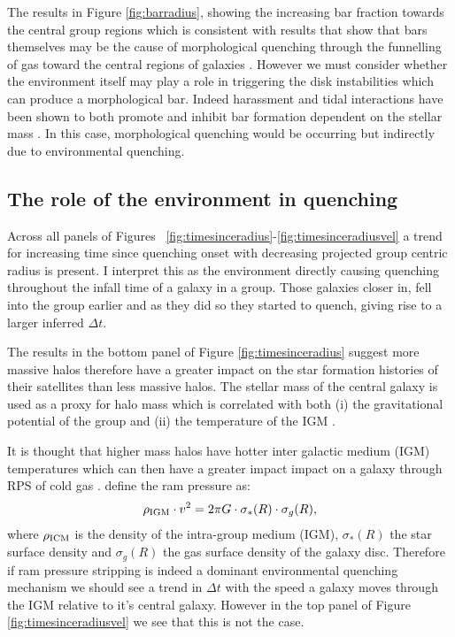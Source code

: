The results in Figure \ref{fig:barradius}, showing the increasing bar fraction towards the central group regions which is consistent with results that show that bars themselves may be the cause of morphological quenching through the funnelling of gas toward the central regions of galaxies \citep{athanassoula92b, sheth05,masters10c}. However we must consider whether the environment itself may play a role in triggering the disk instabilities which can produce a morphological bar. Indeed harassment and tidal interactions have been shown to both promote and inhibit bar formation dependent on the stellar mass \citep{noguchi88, moore96, skibba12}.  In this case, morphological quenching would be occurring but indirectly due to environmental quenching. 

\subsection{The role of the environment in quenching}\label{sec:roleenv}

Across all panels of Figures ~\ref{fig:timesinceradius}-\ref{fig:timesinceradiusvel} a trend for increasing time since quenching onset with decreasing projected group centric radius is present. I interpret this as the environment directly causing quenching throughout the infall time of a galaxy in a group. Those galaxies closer in, fell into the group earlier and as they did so they started to quench, giving rise to a larger inferred $\Delta t$.

The results in the bottom panel of  Figure \ref{fig:timesinceradius} suggest more massive halos therefore have a greater impact on the star formation histories of their satellites than less massive halos. The stellar mass of the central galaxy is used as a proxy for halo mass which is correlated with both (i) the gravitational potential of the group \citep{ref} and (ii) the temperature of the IGM \citep{ref}.

It is thought that higher mass halos have hotter inter galactic medium (IGM) temperatures \citep{ref} which can then have a greater impact impact on a galaxy through RPS of cold gas \citep{ref}. \cite{gunngott72} define the ram pressure as:
\begin{equation}\label{eq:rps}
\rho_{\rm{IGM}}\cdot v^2 = 2\pi G \cdot \sigma_*(R) \cdot \sigma_g(R),
\end{equation}
where $\rho_{\rm{ICM}}$ is the density of the intra-group medium (IGM), $\sigma_*(R)$ the star surface density and $\sigma_g(R)$ the gas surface density of the galaxy disc. Therefore if ram pressure stripping is indeed a dominant environmental quenching mechanism we should see a trend in $\Delta t$ with the speed a galaxy moves through the IGM relative to it's central galaxy.  However in the top panel of Figure \ref{fig:timesinceradiusvel} we see that this is not the case. 

